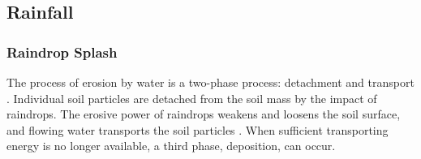 
\subsection{Rainfall}
\label{sec:RainfallCharacteristics}

\subsubsection{Raindrop Splash}
\label{sec:RaindropSplash}

The process of erosion by water is a two-phase process: detachment and transport
\citep{morgan1995-soil}. Individual soil particles are detached from the soil
mass by the impact of raindrops. The erosive power of raindrops weakens and
loosens the soil surface, and flowing water transports the soil particles
\citep{kinnell2000-discourse}. When sufficient transporting energy is no longer
available, a third phase, deposition, can occur.

